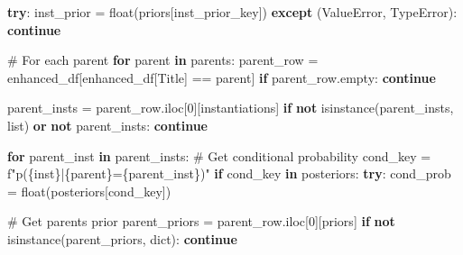\documentclass[
  11pt,
  letterpaper,
]{book}
\newenvironment{Shaded}{\begin{snugshade}}{\end{snugshade}}
\newcommand{\BuiltInTok}[1]{\textcolor[rgb]{0.00,0.23,0.31}{#1}}
\newcommand{\CommentTok}[1]{\textcolor[rgb]{0.37,0.37,0.37}{#1}}
\newcommand{\ControlFlowTok}[1]{\textcolor[rgb]{0.00,0.23,0.31}{\textbf{#1}}}
\newcommand{\DecValTok}[1]{\textcolor[rgb]{0.68,0.00,0.00}{#1}}
\newcommand{\KeywordTok}[1]{\textcolor[rgb]{0.00,0.23,0.31}{\textbf{#1}}}
\newcommand{\NormalTok}[1]{\textcolor[rgb]{0.00,0.23,0.31}{#1}}
\newcommand{\OperatorTok}[1]{\textcolor[rgb]{0.37,0.37,0.37}{#1}}
\newcommand{\PreprocessorTok}[1]{\textcolor[rgb]{0.68,0.00,0.00}{#1}}
\newcommand{\SpecialCharTok}[1]{\textcolor[rgb]{0.37,0.37,0.37}{#1}}
\newcommand{\SpecialStringTok}[1]{\textcolor[rgb]{0.13,0.47,0.30}{#1}}
\newcommand{\StringTok}[1]{\textcolor[rgb]{0.13,0.47,0.30}{#1}}
\begin{document}
\begin{Shaded}
\begin{Highlighting}[]
            \ControlFlowTok{try}\NormalTok{:}
\NormalTok{                inst\_prior }\OperatorTok{=} \BuiltInTok{float}\NormalTok{(priors[inst\_prior\_key])}
            \ControlFlowTok{except}\NormalTok{ (}\PreprocessorTok{ValueError}\NormalTok{, }\PreprocessorTok{TypeError}\NormalTok{):}
                \ControlFlowTok{continue}

            \CommentTok{\# For each parent}
            \ControlFlowTok{for}\NormalTok{ parent }\KeywordTok{in}\NormalTok{ parents:}
\NormalTok{                parent\_row }\OperatorTok{=}\NormalTok{ enhanced\_df[enhanced\_df[}\StringTok{\textquotesingle{}Title\textquotesingle{}}\NormalTok{] }\OperatorTok{==}\NormalTok{ parent]}
                \ControlFlowTok{if}\NormalTok{ parent\_row.empty:}
                    \ControlFlowTok{continue}

\NormalTok{                parent\_insts }\OperatorTok{=}\NormalTok{ parent\_row.iloc[}\DecValTok{0}\NormalTok{][}\StringTok{\textquotesingle{}instantiations\textquotesingle{}}\NormalTok{]}
                \ControlFlowTok{if} \KeywordTok{not} \BuiltInTok{isinstance}\NormalTok{(parent\_insts, }\BuiltInTok{list}\NormalTok{) }\KeywordTok{or} \KeywordTok{not}\NormalTok{ parent\_insts:}
                    \ControlFlowTok{continue}

                \ControlFlowTok{for}\NormalTok{ parent\_inst }\KeywordTok{in}\NormalTok{ parent\_insts:}
                    \CommentTok{\# Get conditional probability}
\NormalTok{                    cond\_key }\OperatorTok{=} \SpecialStringTok{f"p(}\SpecialCharTok{\{}\NormalTok{inst}\SpecialCharTok{\}}\SpecialStringTok{|}\SpecialCharTok{\{}\NormalTok{parent}\SpecialCharTok{\}}\SpecialStringTok{=}\SpecialCharTok{\{}\NormalTok{parent\_inst}\SpecialCharTok{\}}\SpecialStringTok{)"}
                    \ControlFlowTok{if}\NormalTok{ cond\_key }\KeywordTok{in}\NormalTok{ posteriors:}
                        \ControlFlowTok{try}\NormalTok{:}
\NormalTok{                            cond\_prob }\OperatorTok{=} \BuiltInTok{float}\NormalTok{(posteriors[cond\_key])}

                            \CommentTok{\# Get parent\textquotesingle{}s prior}
\NormalTok{                            parent\_priors }\OperatorTok{=}\NormalTok{ parent\_row.iloc[}\DecValTok{0}\NormalTok{][}\StringTok{\textquotesingle{}priors\textquotesingle{}}\NormalTok{]}
                            \ControlFlowTok{if} \KeywordTok{not} \BuiltInTok{isinstance}\NormalTok{(parent\_priors, }\BuiltInTok{dict}\NormalTok{):}
                                \ControlFlowTok{continue}


\end{Highlighting}
\end{Shaded}
\end{document}
